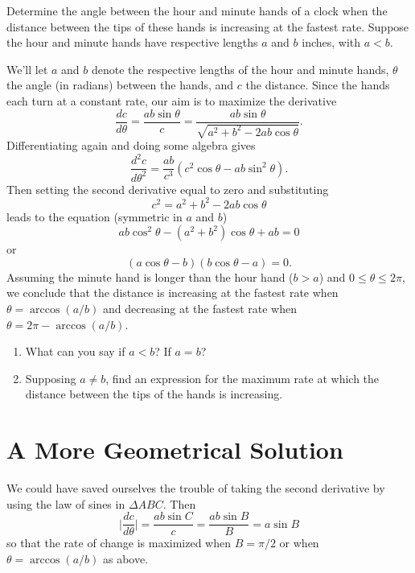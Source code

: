 \documentclass{ximera}
\begin{document}
\begin{question} \label{Q9dgDDGHGMMMB}
Determine the angle between the hour and minute hands of a clock when the distance between the tips of these hands is increasing at the fastest rate. Suppose the hour and minute hands have respective lengths $a$ and $b$ inches, with $a<b$. 

\begin{explanation}
We'll let $a$ and $b$ denote the respective lengths of the hour and minute hands, $\theta$ the angle (in radians) between the hands, and $c$ the distance. Since the hands each turn at a constant rate, our aim is to maximize the derivative
\[
        \frac{dc}{d\theta} = \frac{ab\sin \theta}{c} = \frac{ab \sin \theta}{\sqrt{a^2+b^2-2ab\cos\theta}}.
\]
Differentiating again and doing some algebra gives
\[
       \frac{d^2c}{d\theta^2} = \frac{ab}{c^3} \left( c^2\cos\theta - ab\sin^2\theta  \right).
\]
Then setting the second derivative equal to zero and substituting 
\[
      c^2 = a^2+b^2-2ab\cos\theta
\]
leads to the equation (symmetric in $a$ and $b$)
\[
     ab \cos^2\theta - (a^2 + b^2)\cos\theta + ab = 0
\]
or
\[
              (a \cos \theta - b) (b \cos \theta - a) = 0 .
\]
Assuming the minute hand is longer than the hour hand ($b>a$) and $0\leq \theta \leq 2\pi$, we conclude that the distance is increasing at the fastest rate when $\theta = \arccos(a/b)$ and decreasing at the fastest rate when $\theta  = 2\pi - \arccos(a/b)$.

\end{explanation}
\end{question}


\begin{question} \label{Qdgbhhtnnngnb}
\begin{enumerate}
\item What can you say if $a<b$? If $a=b$?

\item Supposing $a\neq b$, find an expression for the maximum rate at which the distance between the tips of the hands is increasing.
\end{enumerate}
\end{question}


\section*{A More Geometrical Solution}
We could have saved ourselves the trouble of taking the second derivative by using the law of sines in $\Delta ABC$. Then %
\[
    \Big| \frac{dc}{d\theta}  \Big| =   \frac{ab\sin C}{c}  = \frac{ab \sin B}{B} = a\sin B
\]
so that the rate of change is maximized when $B = \pi/2$ or when $\theta = \arccos(a/b)$ as above.
\end{document}
